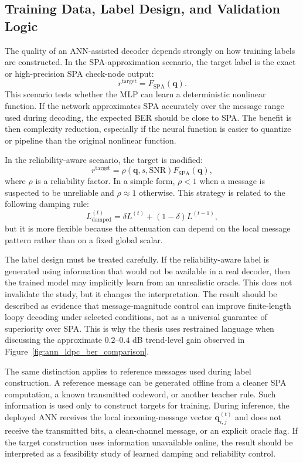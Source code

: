 \subsection{Training Data, Label Design, and Validation Logic}
The quality of an ANN-assisted decoder depends strongly on how training labels are constructed. In the SPA-approximation scenario, the target label is the exact or high-precision SPA check-node output:
\begin{equation}
  r^{\mathrm{target}}=F_{\mathrm{SPA}}(\mathbf{q}).
\end{equation}
This scenario tests whether the MLP can learn a deterministic nonlinear function. If the network approximates SPA accurately over the message range used during decoding, the expected BER should be close to SPA. The benefit is then complexity reduction, especially if the neural function is easier to quantize or pipeline than the original nonlinear function.

In the reliability-aware scenario, the target is modified:
\begin{equation}
  r^{\mathrm{target}}=\rho(\mathbf{q},s,\mathrm{SNR})F_{\mathrm{SPA}}(\mathbf{q}),
\end{equation}
where $\rho$ is a reliability factor. In a simple form, $\rho<1$ when a message is suspected to be unreliable and $\rho\approx 1$ otherwise. This strategy is related to the following damping rule:
\begin{equation}
  L^{(t)}_{\mathrm{damped}}
  =
  \delta L^{(t)}+(1-\delta)L^{(t-1)},
\end{equation}
but it is more flexible because the attenuation can depend on the local message pattern rather than on a fixed global scalar.

The label design must be treated carefully. If the reliability-aware label is generated using information that would not be available in a real decoder, then the trained model may implicitly learn from an unrealistic oracle. This does not invalidate the study, but it changes the interpretation. The result should be described as evidence that message-magnitude control can improve finite-length loopy decoding under selected conditions, not as a universal guarantee of superiority over SPA. This is why the thesis uses restrained language when discussing the approximate $0.2$--$0.4$ dB trend-level gain observed in Figure~\ref{fig:ann_ldpc_ber_comparison}.

The same distinction applies to reference messages used during label construction. A reference message can be generated offline from a cleaner SPA computation, a known transmitted codeword, or another teacher rule. Such information is used only to construct targets for training. During inference, the deployed ANN receives the local incoming-message vector $\mathbf{q}_{i,j}^{(t)}$ and does not receive the transmitted bits, a clean-channel message, or an explicit oracle flag. If the target construction uses information unavailable online, the result should be interpreted as a feasibility study of learned damping and reliability control.

